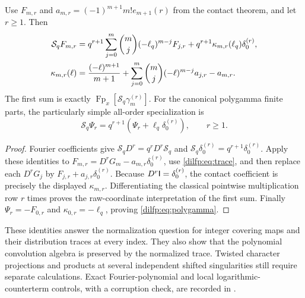 \begin{theorem}
\label{dilfp:thm:derivative}
Use $F_{m,r}$ and $a_{m,r}=(-1)^{m+1}m!e_{m+1}(r)$ from the
contact theorem, and let $r\ge1$. Then
\begin{align}\label{dilfp:eq:derivative}
 \mathcal S_qF_{m,r}
 ={}&q^{r+1}\sum_{j=0}^m\binom mj(-\ell_q)^{m-j}F_{j,r}
                         +q^{r+1}\kappa_{m,r}(\ell_q)\delta_0^{(r)},\notag\\
 \kappa_{m,r}(\ell)
 ={}&\frac{(-\ell)^{m+1}}{m+1}
       +\sum_{j=0}^m\binom mj(-\ell)^{m-j}a_{j,r}-a_{m,r}.
\end{align}
The first sum is exactly
$\operatorname{Fp}_x[\mathcal S_q\gamma_m^{(r)}]$.
For the canonical polygamma finite parts, the particularly simple
all-order specialization is
\begin{equation}\label{dilfp:eq:polygamma}
 \mathcal S_q\Psi_r=q^{r+1}
                   (\Psi_r+\ell_q\delta_0^{(r)}),\qquad r\ge1.
\end{equation}
\end{theorem}
\begin{proof}
Fourier coefficients give
$\mathcal S_qD^r=q^rD^r\mathcal S_q$ and
$\mathcal S_q\delta_0^{(r)}=q^{r+1}\delta_0^{(r)}$.
Apply these identities to $F_{m,r}=D^rG_m-a_{m,r}\delta_0^{(r)}$,
use \eqref{dilfp:eq:trace}, and then replace each
$D^rG_j$ by $F_{j,r}+a_{j,r}\delta_0^{(r)}$.
Because $D^r\mathsf I=\delta_0^{(r)}$, the contact coefficient is
precisely the displayed $\kappa_{m,r}$. Differentiating the classical
pointwise multiplication row $r$ times proves the raw-coordinate
interpretation of the first sum. Finally $\Psi_r=-F_{0,r}$ and
$\kappa_{0,r}=-\ell_q$, proving \eqref{dilfp:eq:polygamma}.
\end{proof}

These identities answer the normalization question for integer covering
maps and their distribution traces at every index. They also show that
the polynomial convolution algebra is preserved by the normalized trace.
Twisted character projections and products at several independent shifted
singularities still require separate calculations. Exact Fourier-polynomial
and local logarithmic-counterterm controls, with a corruption check, are
recorded in .
